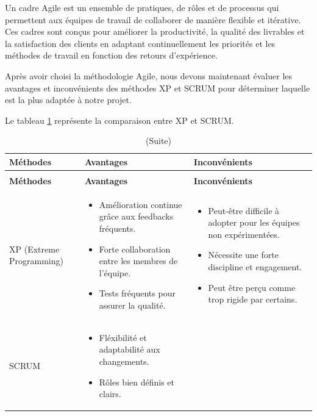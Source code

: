\documentclass[12pt]{report}
\begin{document}
				\hspace{15pt} Un cadre Agile est un ensemble de pratiques, de rôles et de processus qui permettent aux équipes de travail de collaborer de manière flexible et itérative. Ces cadres sont conçus pour améliorer la productivité, la qualité des livrables et la satisfaction des clients en adaptant continuellement les priorités et les méthodes de travail en fonction des retours d'expérience.

				Après avoir choisi la méthodologie Agile, nous devons maintenant évaluer les avantages et inconvénients des méthodes XP et SCRUM pour déterminer laquelle est la plus adaptée à notre projet.

				
				Le tableau \ref{tab:XPvsSCRUM} représente la comparaison entre XP et SCRUM.


				\begin{longtable}{|p{3cm}|p{5.5cm}|p{5.5cm}|} 
						\caption{Comparaison entre XP et SCRUM.} 
						\label{tab:XPvsSCRUM}\\ 
						\hline 
						\textbf{Méthodes} & \textbf{Avantages} & \textbf{Inconvénients}\\ 
						\hline 
						\endfirsthead 	
						\caption[]{(Suite)}\\ 
						\hline 
						\textbf{Méthodes} & \textbf{Avantages} & \textbf{Inconvénients}\\ 
						\hline 
						\endhead
						XP (Extreme Programming) &
						\begin{itemize}
							\item Amélioration continue grâce aux feedbacks fréquents.
							\item Forte collaboration entre les membres de l'équipe.
							\item Tests fréquents pour assurer la qualité.
						\end{itemize}
						&
						\begin{itemize}
							\item Peut-être difficile à adopter pour les équipes non expérimentées.
							\item Nécessite une forte discipline et engagement.
							\item Peut être perçu comme trop rigide par certains.
						\end{itemize}\\						
						\hline
						SCRUM &
						\begin{itemize}
							\item Fléxibilité et adaptabilité aux changements.
							\item Rôles bien définis et clairs.

\end{itemize}
\end{longtable}
\end{document}
